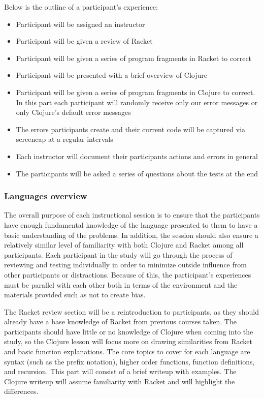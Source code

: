 \documentclass[12pt]{article}
\begin{document}
Below is the outline of a participant's experience:
\begin{itemize}
\item Participant will be assigned an instructor
\item Participant will be given a review of Racket
\item Participant will be given a series of program fragments in Racket to correct
\item Participant will be presented with a brief overview of Clojure
\item Participant will be given a series of  program fragments in Clojure to correct. In this part each participant will randomly receive only our error messages or only Clojure's default error messages
\item The errors participants create and their current code will be captured via screencap at a regular intervals
\item Each instructor will document their participants actions and errors in general
\item The participants will be asked a series of questions about the tests at the end
\end{itemize}

\subsubsection{Languages overview}\label{subsec:overview}

The overall purpose of each instructional session is to ensure that the participants have enough fundamental knowledge of the language presented to them to have a basic understanding of the problems. 
In addition, the session should also ensure a relatively similar level of familiarity with both Clojure and Racket among all participants. 
Each participant in the study will go through the process of reviewing and testing individually in order to minimize outside influence from other participants or distractions. 
Because of this, the participant's experiences must be parallel with each other both in terms of the environment and the materials provided such as not to create bias.

The Racket review section will be a reintroduction to participants, as they should already have a base knowledge of Racket from previous courses taken.
The participants should have little or no knowledge of Clojure when coming into the study, so the Clojure lesson will focus more on drawing similarities from Racket and basic function explanations.
The core topics to cover for each language are syntax (such as the prefix notation), higher order functions, function definitions, and recursion.
This part will consist of a brief writeup with examples. The Clojure writeup will assume familiarity with Racket and will highlight the differences. 
\end{document}
